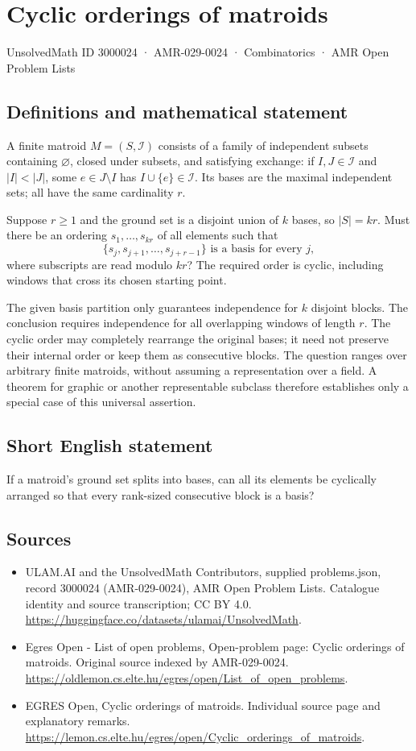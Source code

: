 \documentclass[11pt,a4paper]{article}
\begin{document}
\section*{Cyclic orderings of matroids}\label{3000024}
{\small UnsolvedMath ID 3000024 · AMR-029-0024 · Combinatorics · AMR Open Problem Lists}
\subsection{Definitions and mathematical statement}
A finite matroid $M=(S,\mathcal I)$ consists of a family of independent
subsets containing $\varnothing$, closed under subsets, and satisfying
exchange: if $I,J\in\mathcal I$ and $|I|<|J|$, some $e\in J\setminus I$
has $I\cup\{e\}\in\mathcal I$. Its bases are the maximal independent
sets; all have the same cardinality $r$.

Suppose $r\ge1$ and the ground set is a disjoint union of $k$ bases,
so $|S|=kr$. Must there be an ordering $s_1,\ldots,s_{kr}$ of all
elements such that
\[
                    \{s_j,s_{j+1},\ldots,s_{j+r-1}\}
                        \text{ is a basis for every }j,
\]
where subscripts are read modulo $kr$?
The required order is cyclic, including windows that cross its chosen
starting point.

The given basis partition only guarantees independence for $k$ disjoint
blocks. The conclusion requires independence for all overlapping
windows of length $r$. The cyclic order may completely rearrange the
original bases; it need not preserve their internal order or keep them
as consecutive blocks. The question ranges over arbitrary finite
matroids, without assuming a representation over a field. A theorem
for graphic or another representable subclass therefore establishes
only a special case of this universal assertion.
\subsection{Short English statement}
If a matroid's ground set splits into bases, can all its elements
be cyclically arranged so that every rank-sized consecutive block is a basis?
\subsection{Sources}
\begin{itemize}
\item[S1] ULAM.AI and the UnsolvedMath Contributors, supplied problems.json, record 3000024 (AMR-029-0024), AMR Open Problem Lists. Catalogue identity and source transcription; CC BY 4.0.
\url{https://huggingface.co/datasets/ulamai/UnsolvedMath}.
\item[S2] Egres Open - List of open problems, Open-problem page: Cyclic orderings of matroids. Original source indexed by AMR-029-0024.
\url{https://oldlemon.cs.elte.hu/egres/open/List_of_open_problems}.
\item[S3] EGRES Open, Cyclic orderings of matroids. Individual source page and explanatory remarks.
\url{https://lemon.cs.elte.hu/egres/open/Cyclic_orderings_of_matroids}.
\end{itemize}
\end{document}
